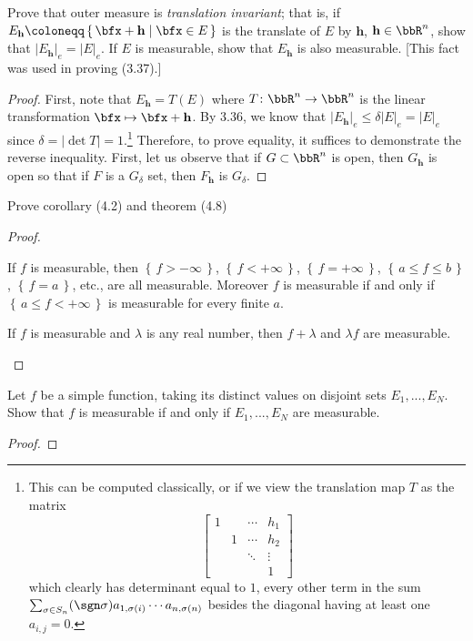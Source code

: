 \begin{problem}
Prove that outer measure is \emph{translation invariant}; that is, if
$E_{\textbf{h}}\coloneqq\left\{\,\bfx+\mathbf{h}\;\middle|\;\bfx\in
  E\,\right\}$ is the translate of $E$ by $\mathbf{h}$,
$\mathbf{h}\in\bbR^n$, show that
$\left|E_{\mathbf{h}}\right|_e=\left|E\right|_e$. If $E$ is measurable,
show that $E_{\mathbf{h}}$ is also measurable. [This fact was used in
proving (3.37).]
\end{problem}
\begin{proof}
First, note that $E_{\mathbf{h}}=T(E)$ where $T\colon\bbR^n\to\bbR^n$ is
the linear transformation $\bfx\mapsto\bfx+\mathbf{h}$. By 3.36, we know
that $\left|E_{\mathbf{h}}\right|_e\leq\delta |E|_e=|E|_e$ since
$\delta=\left|\det T\right|=1$.\footnote{This can be computed classically,
or if we view the translation map $T$ as the matrix
\[
\begin{bmatrix}
1&&\cdots&h_1\\
&1&\cdots&h_2\\
&&\ddots&\vdots\\
&&&1
\end{bmatrix}
\]
which clearly has determinant equal to $1$, every other term in the sum
$\sum_{\sigma\in S_n}(\sgn\sigma)a_{1,\sigma(i)}\cdots a_{n,\sigma(n)}$
besides the diagonal having at least one $a_{i,j}=0$.} Therefore, to prove
equality, it suffices to demonstrate the reverse inequality. First, let us
observe that if $G\subset\bbR^n$ is open, then $G_{\mathbf{h}}$ is open so
that if $F$ is a $G_\delta$ set, then $F_{\mathbf{h}}$ is $G_\delta$.
\end{proof}
\newpage

\begin{problem}
Prove corollary (4.2) and theorem (4.8)
\end{problem}
\begin{proof}
\begin{corollary*}
If $f$ is measurable, then $\left\{\,f>-\infty\,\right\}$,
$\left\{\,f<+\infty\,\right\}$, $\left\{\,f=+\infty\,\right\}$,
$\left\{\,a\leq f\leq b\,\right\}$, $\left\{\,f=a\,\right\}$, etc., are all
measurable. Moreover $f$ is measurable if and only if $\left\{\,a\leq
  f<+\infty\,\right\}$ is measurable for every finite $a$.
\end{corollary*}

\begin{theorem*}
If $f$ is measurable and $\lambda$ is any real number, then $f+\lambda$ and
$\lambda f$ are measurable.
\end{theorem*}
\end{proof}
\newpage

\begin{problem}
Let $f$ be a simple function, taking its distinct values on disjoint sets
$E_1,...,E_N$. Show that $f$ is measurable if and only if $E_1,...,E_N$ are
measurable.
\end{problem}
\begin{proof}
\end{proof}

